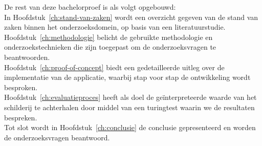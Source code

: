 
De rest van deze bachelorproef is als volgt opgebouwd: \\

In Hoofdstuk~\ref{ch:stand-van-zaken} wordt een overzicht gegeven van de stand van zaken binnen het onderzoeksdomein, op basis van een literatuurstudie. \\ 

Hoofdstuk~\ref{ch:methodologie} belicht de gebruikte methodologie en onderzoekstechnieken die zijn toegepast om de onderzoeksvragen te beantwoorden. \\ 

Hoofdstuk~\ref{ch:proof-of-concept} biedt een gedetailleerde uitleg over de implementatie van de applicatie, waarbij stap voor stap de ontwikkeling wordt besproken. \\ 

Hoofdstuk~\ref{ch:evaluatieproces} heeft als doel de geïnterpreteerde waarde van het schilderij te achterhalen door middel van een turingtest waarin we de resultaten bespreken.  \\

Tot slot wordt in Hoofdstuk~\ref{ch:conclusie} de conclusie gepresenteerd en worden de onderzoeksvragen beantwoord.